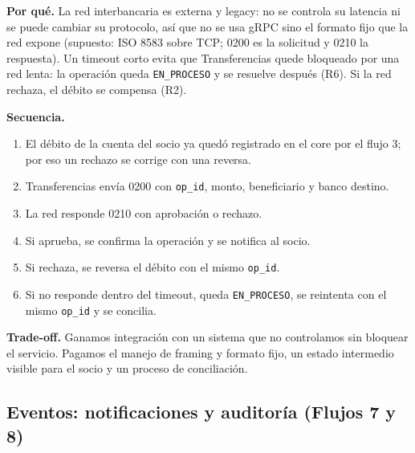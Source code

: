 \documentclass[11pt,a4paper]{article}
\begin{document}
\medskip
\textbf{Por qué.} La red interbancaria es externa y legacy: no se controla su latencia ni se
puede cambiar su protocolo, así que no se usa gRPC sino el formato fijo que la red expone
(supuesto: ISO 8583 sobre TCP; 0200 es la solicitud y 0210 la respuesta). Un timeout corto evita
que Transferencias quede bloqueado por una red lenta: la operación queda \texttt{EN\_PROCESO} y se
resuelve después (R6). Si la red rechaza, el débito se compensa (R2).

\textbf{Secuencia.}
\begin{enumerate}
  \item El débito de la cuenta del socio ya quedó registrado en el core por el flujo 3; por eso un
        rechazo se corrige con una reversa.
  \item Transferencias envía 0200 con \texttt{op\_id}, monto, beneficiario y banco destino.
  \item La red responde 0210 con aprobación o rechazo.
  \item Si aprueba, se confirma la operación y se notifica al socio.
  \item Si rechaza, se reversa el débito con el mismo \texttt{op\_id}.
  \item Si no responde dentro del timeout, queda \texttt{EN\_PROCESO}, se reintenta con el mismo
        \texttt{op\_id} y se concilia.
\end{enumerate}

\textbf{Trade-off.} Ganamos integración con un sistema que no controlamos sin bloquear el
servicio. Pagamos el manejo de framing y formato fijo, un estado intermedio visible para el
socio y un proceso de conciliación.


\subsection{Eventos: notificaciones y auditoría (Flujos 7 y 8)}
\end{document}
